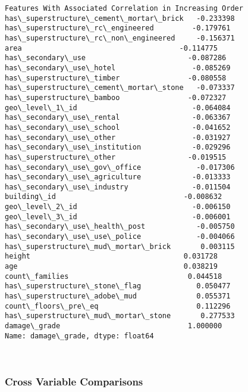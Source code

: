 \documentclass[11pt]{article}
\begin{document}
    \begin{Verbatim}[commandchars=\\\{\}]
Features With Associated Correlation in Increasing Order
has\_superstructure\_cement\_mortar\_brick   -0.233398
has\_superstructure\_rc\_engineered         -0.179761
has\_superstructure\_rc\_non\_engineered     -0.156371
area                                     -0.114775
has\_secondary\_use                        -0.087286
has\_secondary\_use\_hotel                  -0.085269
has\_superstructure\_timber                -0.080558
has\_superstructure\_cement\_mortar\_stone   -0.073337
has\_superstructure\_bamboo                -0.072327
geo\_level\_1\_id                           -0.064084
has\_secondary\_use\_rental                 -0.063367
has\_secondary\_use\_school                 -0.041652
has\_secondary\_use\_other                  -0.031927
has\_secondary\_use\_institution            -0.029296
has\_superstructure\_other                 -0.019515
has\_secondary\_use\_gov\_office             -0.017306
has\_secondary\_use\_agriculture            -0.013333
has\_secondary\_use\_industry               -0.011504
building\_id                              -0.008632
geo\_level\_2\_id                           -0.006150
geo\_level\_3\_id                           -0.006001
has\_secondary\_use\_health\_post            -0.005750
has\_secondary\_use\_use\_police             -0.004066
has\_superstructure\_mud\_mortar\_brick       0.003115
height                                    0.031728
age                                       0.038219
count\_families                            0.044518
has\_superstructure\_stone\_flag             0.050477
has\_superstructure\_adobe\_mud              0.055371
count\_floors\_pre\_eq                       0.112296
has\_superstructure\_mud\_mortar\_stone       0.277533
damage\_grade                              1.000000
Name: damage\_grade, dtype: float64

    \end{Verbatim}

    \begin{center}
    \end{center}
    { \hspace*{\fill} \\}
    
    \subsubsection{Cross Variable
Comparisons}\label{cross-variable-comparisons}
\end{document}
